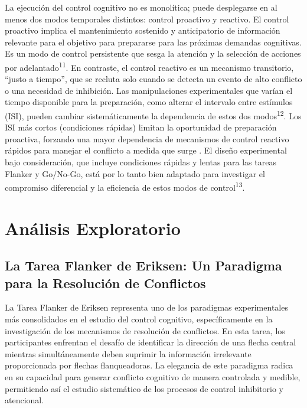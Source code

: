 \documentclass[
  spanish,
  10pt,
]{article}
\begin{document}
La ejecución del control cognitivo no es monolítica; puede desplegarse
en al menos dos modos temporales distintos: control proactivo y
reactivo. El control proactivo implica el mantenimiento sostenido y
anticipatorio de información relevante para el objetivo para prepararse
para las próximas demandas cognitivas. Es un modo de control persistente
que sesga la atención y la selección de acciones por
adelantado\textsuperscript{11}. En contraste, el control reactivo es un
mecanismo transitorio, ``justo a tiempo'', que se recluta solo cuando se
detecta un evento de alto conflicto o una necesidad de inhibición. Las
manipulaciones experimentales que varían el tiempo disponible para la
preparación, como alterar el intervalo entre estímulos (ISI), pueden
cambiar sistemáticamente la dependencia de estos dos
modos\textsuperscript{12}. Los ISI más cortos (condiciones rápidas)
limitan la oportunidad de preparación proactiva, forzando una mayor
dependencia de mecanismos de control reactivo rápidos para manejar el
conflicto a medida que surge . El diseño experimental bajo
consideración, que incluye condiciones rápidas y lentas para las tareas
Flanker y Go/No-Go, está por lo tanto bien adaptado para investigar el
compromiso diferencial y la eficiencia de estos modos de
control\textsuperscript{13}.

\section{Análisis Exploratorio}\label{anuxe1lisis-exploratorio}

\subsection{La Tarea Flanker de Eriksen: Un Paradigma para la Resolución
de
Conflictos}\label{la-tarea-flanker-de-eriksen-un-paradigma-para-la-resoluciuxf3n-de-conflictos}

La Tarea Flanker de Eriksen representa uno de los paradigmas
experimentales más consolidados en el estudio del control cognitivo,
específicamente en la investigación de los mecanismos de resolución de
conflictos. En esta tarea, los participantes enfrentan el desafío de
identificar la dirección de una flecha central mientras simultáneamente
deben suprimir la información irrelevante proporcionada por flechas
flanqueadoras. La elegancia de este paradigma radica en su capacidad
para generar conflicto cognitivo de manera controlada y medible,
permitiendo así el estudio sistemático de los procesos de control
inhibitorio y atencional.
\end{document}
